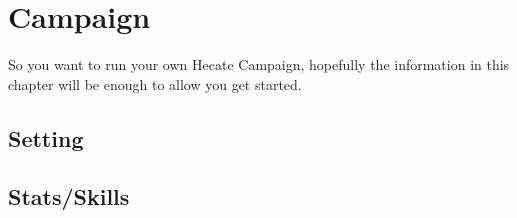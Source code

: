 
\chapter{Campaign}
So you want to run your own Hecate Campaign, hopefully the
information in this chapter will be enough to allow you get started.

\section{Setting}


\section{Stats/Skills}


